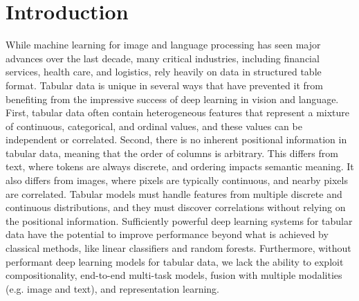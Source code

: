 \documentclass{article}
\newcommand{\bayan}[1]{\textcolor{cyan}{#1}}
\begin{document}
\section{Introduction}
\label{sec:introduction}
While machine learning for image and language processing has seen major advances over the last decade, many critical industries, including financial services, health care, and logistics, rely heavily on data in structured table format. %
%
Tabular data is unique in several ways that have prevented it from benefiting from the impressive success of deep learning in vision and language. First, tabular data often contain heterogeneous features that represent a mixture of continuous, categorical, and ordinal values, and these values can be independent or correlated. Second, there is no inherent positional information in tabular data, meaning that the order of columns is arbitrary. This differs from text, where tokens are always discrete, and ordering impacts semantic meaning.  It also differs from images, where pixels are typically continuous, and nearby pixels are correlated. Tabular models must handle features from multiple discrete and continuous distributions, and they must discover correlations without relying on the positional information. Sufficiently powerful deep learning systems for tabular data have the potential to improve performance beyond what is achieved by classical methods, like linear classifiers and random forests.  Furthermore, without performant deep learning models for tabular data, we lack the ability to exploit compositionality, end-to-end multi-task models, fusion with multiple modalities (e.g. image and text), and representation learning. %
\end{document}
